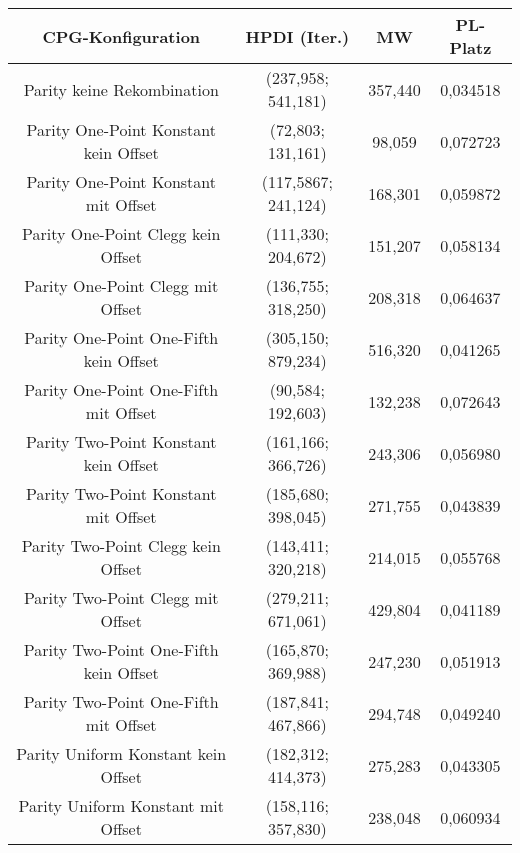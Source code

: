 \begin{table}[H]
	\centering
	\begin{tabular}{c | c | c | c}
		\textbf{CPG-Konfiguration} & \textbf{HPDI (Iter.)} & \textbf{MW} & \textbf{PL-Platz}\\
		\hline
		Parity keine Rekombination & (237,958; 541,181) & \color{red}357,440\color{black} & \color{red}0,034518\color{black}\\
		\hline
		\hline
		Parity One-Point Konstant kein Offset & \color{Green}(72,803; 131,161)\color{black} & \color{Green}98,059\color{black} & \color{Green} 0,072723 \color{black}\\
		\hline
		Parity One-Point Konstant mit Offset & (117,5867; 241,124) & 168,301 & 0,059872\\
		\hline
		Parity One-Point Clegg kein Offset & \color{Green}(111,330; 204,672)\color{black} & \color{Green}151,207\color{black} & 0,058134\\
		\hline
		Parity One-Point Clegg mit Offset & (136,755; 318,250) & 208,318 & \color{Green}0,064637\color{black}\\
		\hline
		Parity One-Point One-Fifth kein Offset & \color{red}(305,150; 879,234)\color{black} & \color{red}516,320\color{black} & 0,041265\\
		\hline
		Parity One-Point One-Fifth mit Offset & \color{Green}(90,584; 192,603)\color{black} & \color{Green}132,238\color{black} & \color{Green}0,072643 \color{black}\\
		\hline
		\hline
		Parity Two-Point Konstant kein Offset & (161,166; 366,726) & 243,306 & 0,056980\\
		\hline
		Parity Two-Point Konstant mit Offset & (185,680; 398,045) & 271,755 & 0,043839\\
		\hline
		Parity Two-Point Clegg kein Offset & (143,411; 320,218) & 214,015 & 0,055768\\
		\hline
		Parity Two-Point Clegg mit Offset & \color{red}(279,211; 671,061)\color{black} & \color{red}429,804\color{black} & 0,041189\\
		\hline
		Parity Two-Point One-Fifth kein Offset & (165,870; 369,988) & 247,230 & 0,051913\\
		\hline
		Parity Two-Point One-Fifth mit Offset & (187,841; 467,866) & 294,748 & 0,049240\\
		\hline
		\hline
		Parity Uniform Konstant kein Offset & (182,312; 414,373) & 275,283 & 0,043305\\
		\hline
		Parity Uniform Konstant mit Offset & (158,116; 357,830) & 238,048 & 0,060934\\

\end{tabular}
\end{table}

